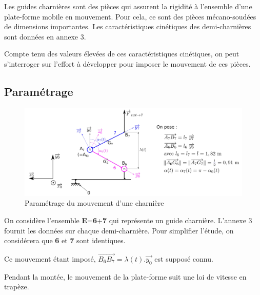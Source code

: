 Les guides charnières sont des pièces qui assurent la rigidité à l'ensemble d'une plate-forme mobile en mouvement. Pour cela, ce sont des pièces mécano-soudées de dimensions importantes. Les caractéristiques cinétiques des demi-charnières sont données en annexe 3.

Compte tenu des valeurs élevées de ces caractéristiques cinétiques, on peut s'interroger sur l'effort à développer pour imposer le mouvement de ces pièces.

\subsection{Paramétrage}

\begin{figure}[!h]
 \centering\includegraphics[width=0.7\linewidth]{img/fig14}
 \caption{Paramétrage du mouvement d'une charnière}
 \label{fig14}
\end{figure}

On considère l'ensemble \textbf{E}={\textbf{6}+\textbf{7}} qui représente un guide charnière. L'annexe 3 fournit les données sur chaque demi-charnière. Pour simplifier l'étude, on considérera que \textbf{6} et \textbf{7} sont identiques.


Ce mouvement étant imposé, $\overrightarrow{B_6B_7}=\lambda(t).\overrightarrow{y_0}$ est supposé connu.

Pendant la montée, le mouvement de la plate-forme suit une loi de vitesse en trapèze.



